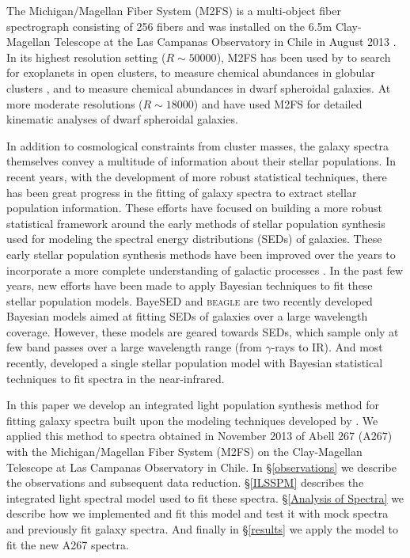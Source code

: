 \documentclass[twocolumn]{aastex6}
\begin{document}
The Michigan/Magellan Fiber System (M2FS) is a multi-object fiber spectrograph consisting of 256 fibers and was installed on the 6.5m Clay-Magellan Telescope at the Las Campanas Observatory in Chile in August 2013 \citep[][]{Mateo2012, Bailey2014}.
In its highest resolution setting ($R\sim50000$), M2FS has been used by \citet{Bailey2016} to search for exoplanets in open clusters, \citet{Johnson2015a} to measure chemical abundances in globular clusters \citep[see also][]{Johnson2015b, Roederer2016a, Johnson2017}, and \citet{Roederer2016b} to measure chemical abundances in dwarf spheroidal galaxies.
At more moderate resolutions ($R\sim18000$) \citet{Walker2015b,Walker2016} and \citet{Simon2015} have used M2FS for detailed kinematic analyses of dwarf spheroidal galaxies.

In addition to cosmological constraints from cluster masses, the galaxy spectra themselves convey a multitude of information about their stellar populations.
In recent years, with the development of more robust statistical techniques, there has been great progress in the fitting of galaxy spectra to extract stellar population information.
These efforts have focused on building a more robust statistical framework around the early methods of stellar population synthesis \citep[][]{Tinsley1972, Searle1973, Larson1978} used for modeling the spectral energy distributions (SEDs) of galaxies.
These early stellar population synthesis methods have been improved over the years to incorporate a more complete understanding of galactic processes \citep[see][for a review]{Walcher2011}.
In the past few years, new efforts have been made to apply Bayesian techniques to fit these stellar population models.
BayeSED \citep[][]{Han2014} and \textsc{beagle} \citep[][]{ Chevallard2016} are two recently developed Bayesian models aimed at fitting SEDs of galaxies over a large wavelength coverage.
However, these models are geared towards SEDs, which sample only at few band passes over a large wavelength range (from $\gamma$-rays to IR).
And most recently, \citet{Meneses2015} developed a single stellar population model with Bayesian statistical techniques to fit spectra in the near-infrared.

In this paper we develop an integrated light population synthesis method for fitting galaxy spectra built upon the modeling techniques developed by \citet{Walker2015a}.
We applied this method to spectra obtained in November 2013 of Abell 267 (A267) with the Michigan/Magellan Fiber System (M2FS) on the Clay-Magellan Telescope at Las Campanas Observatory in Chile.
In \S\ref{observations} we describe the observations and subsequent data reduction.
\S\ref{ILSSPM} describes the integrated light spectral model used to fit these spectra.
\S\ref{Analysis of Spectra} we describe how we implemented and fit this model and test it with mock spectra and previously fit galaxy spectra.
And finally in \S\ref{results} we apply the model to fit the new A267 spectra.
\end{document}
